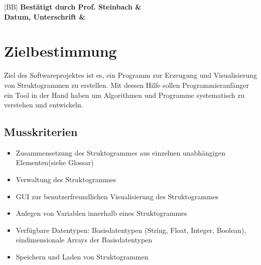 \documentclass[a4paper,10pt]{report}
\begin{document}
\begin{titlepage}
\begin{tabular}{|c|l|l|l|l|}
\end{tabular} 

\vspace{10mm}

\begin{center}
\begin{tabular}{|BB|}
\hline
\bfseries \large Best\"{a}tigt durch Prof. Steinbach & \quad \quad \quad \quad \quad \quad \quad \quad \quad \\
\bfseries \large Datum, Unterschrift &
\\
\hline
\end{tabular}
\end{center}

\end{titlepage}

\newpage
\renewcommand{\thesection}{\arabic{section}}

\tableofcontents
\newpage

\section{Zielbestimmung}
Ziel des Softwareprojektes ist es, ein Programm zur Erzeugung und Visualisierung von Struktogrammen zu erstellen. 
Mit dessen Hilfe sollen Programmieranf\"{a}nger ein Tool in der Hand haben um Algorithmen und Programme systematisch zu verstehen und entwickeln.

\subsection{Musskriterien}
\begin{itemize}

\item Zusammensetzung des Struktogrammes aus einzelnen unabhängigen Elementen(siehe Glossar)
\item Verwaltung des Struktogrammes
\item GUI zur benutzerfreundlichen Visualisierung des Struktogrammes
\item Anlegen von Variablen innerhalb eines Struktogrammes
\item Verfügbare Datentypen: Basisdatentypen (String, Float, Integer, Boolean), eindimensionale Arrays der Basisdatentypen
\item Speichern und Laden von Struktogrammen


\end{itemize}
\end{document}
